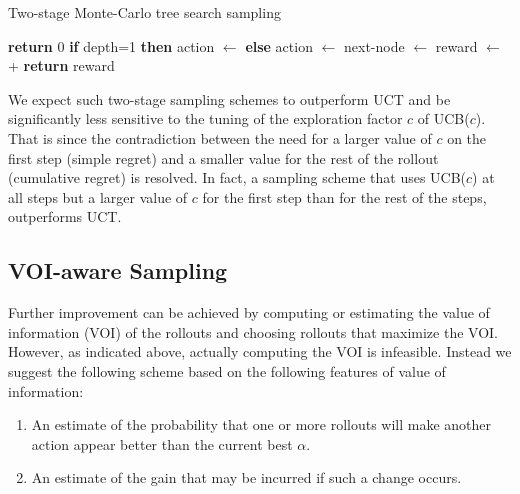 \documentclass[letterpaper]{article}
\begin{document}
\begin{algorithm}[h!]
\caption{Two-stage Monte-Carlo tree search sampling}
\label{alg:two-stage-mcts}
\begin{algorithmic}[1]
    \State \textbf{return} 0
  \Else
    \State \textbf{if} depth=1 \textbf{then} action $\gets$  \label{alg:srcr-first-action}   
    \State \textbf{else} action $\gets$  \label{alg:srcr-next-action}
    \State next-node $\gets$ 
    \State reward $\gets$ 
     \State \hspace{4em} + 
    \State {}
    \State \textbf{return} reward
  \EndIf
\EndProcedure
\end{algorithmic}
\end{algorithm}

We expect such two-stage sampling schemes to
outperform UCT and be
significantly less sensitive to the tuning of the exploration factor
$c$ of UCB($c$). That is since the contradiction between the need for a larger
value of $c$ on the first step (simple regret) and a smaller
value for the rest of the rollout (cumulative regret)
\cite{Bubeck.pure} is resolved. In fact, a sampling scheme that uses
UCB($c$) at all steps but a larger value of $c$ for the first step
than for the rest of the steps, outperforms UCT. 


\subsection{VOI-aware Sampling}
\label{sec:voi-sampling}

Further improvement can be achieved by computing or estimating the
value of information (VOI) of the rollouts and choosing rollouts that
maximize the VOI. 
However, as indicated above, actually computing the VOI is infeasible.
Instead we suggest the following scheme based on the following
features of value of information:
\begin{enumerate}
\item An estimate of the probability that one or more rollouts will make another action
appear better than the current best $\alpha $.
\item An estimate of the gain that may be incurred if such a change occurs.
\end{enumerate}
\end{document}
